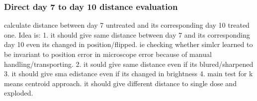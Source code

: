 \subsubsection{Direct day 7 to day 10 distance evaluation}
calculate distance between day 7 untreated and its corresponding day 10 treated one.
Idea is:
1. it should give same distance between day 7 and its corresponding day 10
 even its changed in position/flipped. ie checking whether simlcr learned to 
 be invariant to position error in microscope error because of manual 
 handling/transporting.
2. it sould give same distance even if its blured/sharpened
3. it should give sma edistance even if its changed in brightness
4. main test for k means centroid approach. it should give different distance to single dose and exploded.

